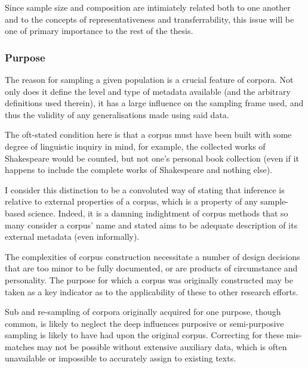 Since sample size and composition are intimiately related both to one another and to the concepts of representativeness and transferrability, this issue will be one of primary importance to the rest of the thesis.






\subsubsection{Purpose}
The reason for sampling a given population is a crucial feature of corpora.  Not only does it define the level and type of metadata available (and the arbitrary definitions used therein), it has a large influence on the sampling frame used, and thus the validity of any generalisations made using said data.

The oft-stated condition here is that a corpus must have been built with some degree of linguistic inquiry in mind, for example, the collected works of Shakespeare would be counted, but not one's personal book collection (even if it happens to include the complete works of Shakespeare and nothing else). %

I consider this distinction to be a convoluted way of stating that inference is relative to external properties of a corpus, which is a property of any sample-based science.  Indeed, it is a damning indightment of corpus methods that so many consider a corpus' name and stated aims to be adequate description of its external metadata (even informally).  

The complexities of corpus construction necessitate a number of design decisions that are too minor to be fully documented, or are products of circumstance and personality.  The purpose for which a corpus was originally constructed may be taken as a key indicator as to the applicability of these to other research efforts.

Sub and re-sampling of corpora originally acquired for one purpose, though common, is likely to neglect the deep influences purposive or semi-purposive sampling is likely to have had upon the original corpus.  Correcting for these mis-matches may not be possible without extensive auxiliary data, which is often unavailable or impossible to accurately assign to existing texts.



